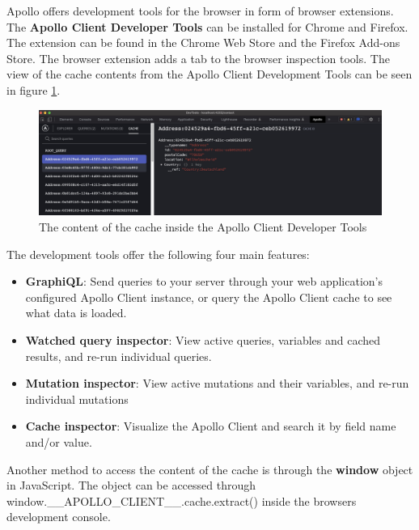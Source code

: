 Apollo offers development tools for the browser in form of browser extensions. The \textbf{Apollo Client Developer Tools} can be installed for Chrome and Firefox. The extension can be found in the Chrome Web Store and the Firefox Add-ons Store. The browser extension adds a tab to the browser inspection tools. \cite{misc:-:background:graphql:apollo-developer-tools} The view of the cache contents from the Apollo Client Development Tools can be seen in figure \ref{fig:background:graphql:apollo:apollo-dev-tools}.

\ifshowImages
\begin{figure}[H]
    \centering
    \includegraphics[width=1\linewidth]{images/background/apollo/apollo-dev-tools.jpeg}
    \caption{The content of the cache inside the Apollo Client Developer Tools}\label{fig:background:graphql:apollo:apollo-dev-tools}
\end{figure}
\fi

The development tools offer the following four main features: \cite{misc:-:background:graphql:apollo-developer-tools}

\begin{itemize}
    \item \textbf{GraphiQL}: Send queries to your server through your web application's configured Apollo Client instance, or query the Apollo Client cache to see what data is loaded.
    \item \textbf{Watched query inspector}: View active queries, variables and cached results, and re-run individual queries.
    \item \textbf{Mutation inspector}: View active mutations and their variables, and re-run individual mutations
    \item \textbf{Cache inspector}: Visualize the Apollo Client and search it by field name and/or value.
\end{itemize}

Another method to access the content of the cache is through the \textbf{window} object in JavaScript. The object can be accessed through window.\_\_APOLLO\_CLIENT\_\_.cache.extract() inside the browsers development console.


